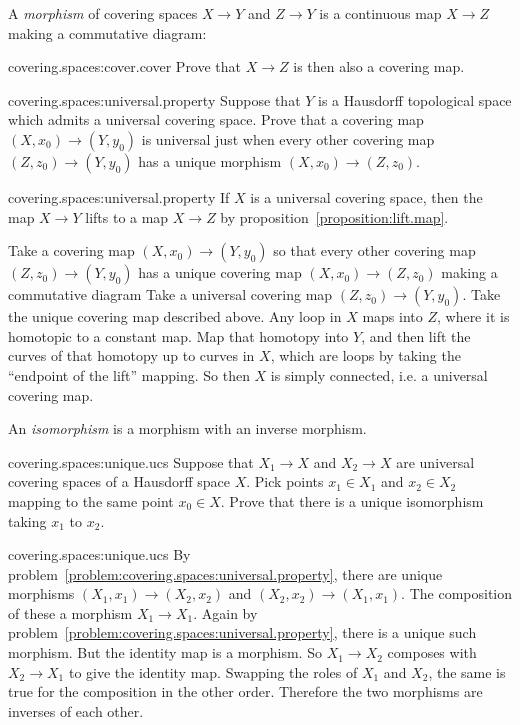 A \emph{morphism} of covering spaces \(X \to Y\) and \(Z \to Y\) is a continuous map \(X \to Z\) making a commutative diagram:
\begin{problem}{covering.spaces:cover.cover}
Prove that \(X \to Z\) is then also a covering map.
\end{problem}
\begin{problem}{covering.spaces:universal.property}
Suppose that \(Y\) is a Hausdorff topological space which admits a universal covering space.
Prove that a covering map \((X,x_0) \to (Y,y_0)\) is universal just when every other covering map \((Z,z_0) \to (Y,y_0)\) has a unique morphism \((X,x_0) \to (Z,z_0)\).
\end{problem}
\begin{answer}{covering.spaces:universal.property}
If \(X\) is a universal covering space, then the map \(X \to Y\) lifts to a map \(X \to Z\) by proposition~\vref{proposition:lift.map}.

Take a covering map \((X,x_0) \to (Y,y_0)\) so that every other covering map \((Z,z_0) \to (Y,y_0)\) has a unique covering map \((X,x_0) \to (Z,z_0)\) making a commutative diagram
Take a universal covering map \((Z,z_0) \to (Y,y_0)\).
Take the unique covering map described above.
Any loop in \(X\) maps into \(Z\), where it is homotopic to a constant map.
Map that homotopy into \(Y\), and then lift the curves of that homotopy up to curves in \(X\), which are loops by taking the ``endpoint of the lift'' mapping.
So then \(X\) is simply connected, i.e. a universal covering map.
\end{answer}
An \emph{isomorphism}
is a morphism with an inverse morphism.
\begin{problem}{covering.spaces:unique.ucs}
Suppose that \(X_1 \to X\) and \(X_2 \to X\) are universal covering spaces of a Hausdorff space \(X\).
Pick points \(x_1 \in X_1\) and \(x_2 \in X_2\) mapping to the same point \(x_0 \in X\).
Prove that there is a unique isomorphism taking \(x_1\) to \(x_2\).
\end{problem}
\begin{answer}{covering.spaces:unique.ucs}
By problem~\vref{problem:covering.spaces:universal.property}, there are unique morphisms \((X_1,x_1) \to (X_2,x_2)\) and \((X_2,x_2) \to (X_1,x_1)\).
The composition of these a morphism \(X_1 \to X_1\). 
Again by problem~\vref{problem:covering.spaces:universal.property}, there is a unique such morphism.
But the identity map is a morphism.
So \(X_1 \to X_2\) composes with \(X_2 \to X_1\) to give the identity map.
Swapping the roles of \(X_1\) and \(X_2\), the same is true for the composition in the other order.
Therefore the two morphisms are inverses of each other.
\end{answer}
